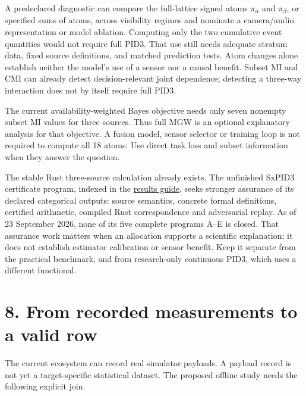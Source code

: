 \documentclass[11pt,a4paper]{article}
\newcounter{none}
\begin{document}
A predeclared diagnostic can compare the full-lattice signed atoms \(\pi_\alpha\) and \(\pi_\beta\), or specified sums of atoms, across visibility regimes and nominate a camera/audio representation or model ablation. Computing only the two cumulative event quantities would not require full PID3. That use still needs adequate stratum data, fixed source definitions, and matched prediction tests. Atom changes alone establish neither the model's use of a sensor nor a causal benefit. Subset MI and CMI can already detect decision-relevant joint dependence; detecting a three-way interaction does not by itself require full PID3.

The current availability-weighted Bayes objective needs only seven nonempty subset MI values for three sources. Thus full MGW is an optional explanatory analysis for that objective. A fusion model, sensor selector or training loop is not required to compute all 18 atoms. Use direct task loss and subset information when they answer the question.

The stable Rust three-source calculation already exists. The unfinished SxPID3 certificate program, indexed in the \href{https://github.com/sepahead/pid-rs/blob/main/MATHEMATICAL_RESULTS_GUIDE.md}{results guide}, seeks stronger assurance of its declared categorical outputs: source semantics, concrete formal definitions, certified arithmetic, compiled Rust correspondence and adversarial replay. As of 23 September 2026, none of its five complete programs A--E is closed. That assurance work matters when an allocation supports a scientific explanation; it does not establish estimator calibration or sensor benefit. Keep it separate from the practical benchmark, and from research-only continuous PID3, which uses a different functional.

\par{}

\section{8. From recorded measurements to a valid row}\label{from-recorded-measurements-to-a-valid-row}

The current ecosystem can record real simulator payloads. A payload record is not yet a target-specific statistical dataset. The proposed offline study needs the following explicit join.
\end{document}
